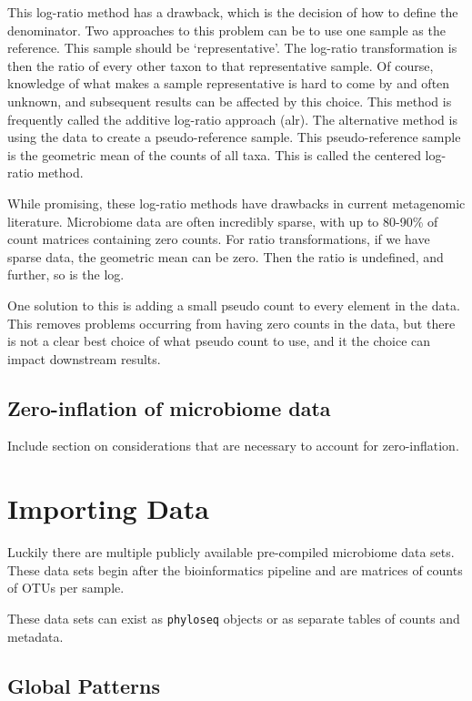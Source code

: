 \documentclass[
]{book}
\begin{document}
This log-ratio method has a drawback, which is the decision of how to define the denominator. Two approaches to this problem can be to use one sample as the reference. This sample should be `representative'. The log-ratio transformation is then the ratio of every other taxon to that representative sample. Of course, knowledge of what makes a sample representative is hard to come by and often unknown, and subsequent results can be affected by this choice. This method is frequently called the additive log-ratio approach (alr).
The alternative method is using the data to create a pseudo-reference sample. This pseudo-reference sample is the geometric mean of the counts of all taxa. This is called the centered log-ratio method.

While promising, these log-ratio methods have drawbacks in current metagenomic literature. Microbiome data are often incredibly sparse, with up to 80-90\% of count matrices containing zero counts. For ratio transformations, if we have sparse data, the geometric mean can be zero. Then the ratio is undefined, and further, so is the log.

One solution to this is adding a small pseudo count to every element in the data. This removes problems occurring from having zero counts in the data, but there is not a clear best choice of what pseudo count to use, and it the choice can impact downstream results.

\hypertarget{zero-inflation-of-microbiome-data}{%
\section{Zero-inflation of microbiome data}\label{zero-inflation-of-microbiome-data}}

Include section on considerations that are necessary to account for zero-inflation.

\hypertarget{importing-data}{%
\chapter{Importing Data}\label{importing-data}}

Luckily there are multiple publicly available pre-compiled microbiome data sets. These data sets begin after the bioinformatics pipeline and are matrices of counts of OTUs per sample.

These data sets can exist as \texttt{phyloseq} objects or as separate tables of counts and metadata.

\hypertarget{global-patterns}{%
\section{Global Patterns}\label{global-patterns}}
\end{document}
